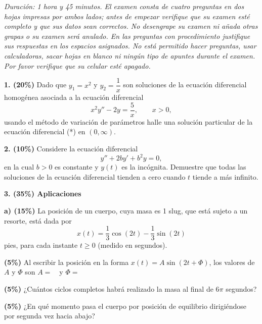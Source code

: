 \documentclass[11pt]{article}
\newcommand{\rp}{\underline{\hspace{3cm}}}
\begin{document}
\examheader

\vspace{4pt}
\noindent\textit{Duración: 1 hora y 45 minutos. El examen consta de cuatro preguntas en dos hojas impresas por ambos lados; antes de empezar verifique que su examen esté completo y que sus datos sean correctos. No desengrape su examen ni añada otras grapas o su examen será anulado. En las preguntas con procedimiento justifique sus respuestas en los espacios asignados. No está permitido hacer preguntas, usar calculadoras, sacar hojas en blanco ni ningún tipo de apuntes durante el examen. Por favor verifique que su celular esté apagado.}

\vspace{6pt}
\noindent\textbf{1. (20\%)} Dado que $y_1=x^2$ y $y_2=\dfrac{1}{x}$ son soluciones de la ecuación diferencial homogénea asociada a la ecuación diferencial
\[
x^2y''-2y=\frac{5}{x}, \qquad x>0, \tag{*}
\]
usando el método de variación de parámetros halle una solución particular de la ecuación diferencial (*) en $(0,\infty)$.

\vspace{6cm}

\newpage

\noindent\textbf{2. (10\%)} Considere la ecuación diferencial
\[
y''+2by'+b^2y=0,
\]
en la cual $b>0$ es constante y $y(t)$ es la incógnita. Demuestre que todas las soluciones de la ecuación diferencial tienden a cero cuando $t$ tiende a más infinito.

\vspace{6cm}

\noindent\textbf{3. (35\%) Aplicaciones}

\vspace{0.2cm}
\noindent\textbf{a) (15\%)} La posición de un cuerpo, cuya masa es 1 slug, que está sujeto a un resorte, está dada por
\[
x(t)=\frac{1}{3}\cos(2t)-\frac{1}{3}\sin(2t)
\]
pies, para cada instante $t\geq 0$ (medido en segundos).
\begin{opciones}
\item \textbf{(5\%)} Al escribir la posición en la forma $x(t)=A\sin(2t+\Phi)$, los valores de $A$ y $\Phi$ son $A=$~\rp\ y $\Phi=$~\rp
\item \textbf{(5\%)} ¿Cuántos ciclos completos habrá realizado la masa al final de $6\pi$ segundos?
\item \textbf{(5\%)} ¿En qué momento pasa el cuerpo por posición de equilibrio dirigiéndose por segunda vez hacia abajo?
\end{opciones}
\end{document}
